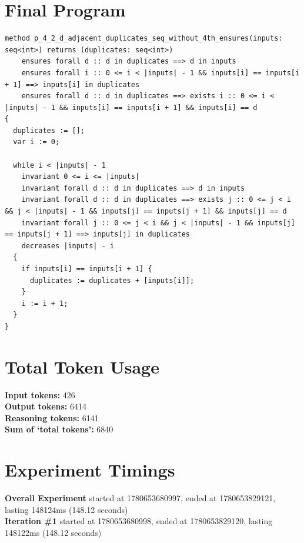 \documentclass{article}
\begin{document}
\section*{Final Program}
\begin{lstlisting}
method p_4_2_d_adjacent_duplicates_seq_without_4th_ensures(inputs: seq<int>) returns (duplicates: seq<int>)
	ensures forall d :: d in duplicates ==> d in inputs
	ensures forall i :: 0 <= i < |inputs| - 1 && inputs[i] == inputs[i + 1] ==> inputs[i] in duplicates
	ensures forall d :: d in duplicates ==> exists i :: 0 <= i < |inputs| - 1 && inputs[i] == inputs[i + 1] && inputs[i] == d
{
  duplicates := [];
  var i := 0;

  while i < |inputs| - 1
    invariant 0 <= i <= |inputs|
    invariant forall d :: d in duplicates ==> d in inputs
    invariant forall d :: d in duplicates ==> exists j :: 0 <= j < i && j < |inputs| - 1 && inputs[j] == inputs[j + 1] && inputs[j] == d
    invariant forall j :: 0 <= j < i && j < |inputs| - 1 && inputs[j] == inputs[j + 1] ==> inputs[j] in duplicates
    decreases |inputs| - i
  {
    if inputs[i] == inputs[i + 1] {
      duplicates := duplicates + [inputs[i]];
    }
    i := i + 1;
  }
}
\end{lstlisting}
\section*{Total Token Usage}
\textbf{Input tokens: }426
\\\textbf{Output tokens: }6414
\\\textbf{Reasoning tokens: }6141
\\\textbf{Sum of `total tokens': }6840
\section*{Experiment Timings}
\textbf{Overall Experiment} started at 1780653680997, ended at 1780653829121, lasting 148124ms (148.12 seconds)
\\\textbf{Iteration \#1} started at 1780653680998, ended at 1780653829120, lasting 148122ms (148.12 seconds)
\end{document}
